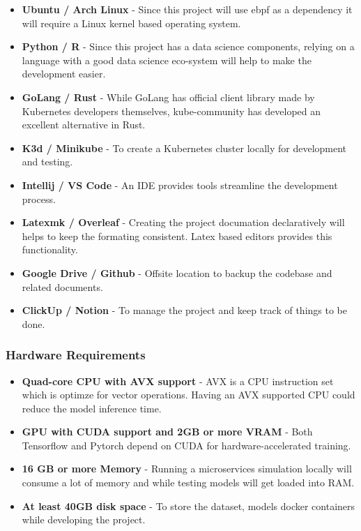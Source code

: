 \begin{itemize}[noitemsep,nolistsep] 
\item \textbf{Ubuntu / Arch Linux} - Since this project will use \ac{ebpf} as a dependency it will require a Linux kernel based operating system.
\item \textbf{Python / R} - Since this project has a data science components, relying on a language with a good data science eco-system will help to make the development easier.
\item \textbf{GoLang / Rust} - While GoLang has official client library made by Kubernetes developers themselves, kube-community has developed an excellent alternative in Rust.
\item \textbf{K3d / Minikube} - To create a Kubernetes cluster locally for development and testing.
\item \textbf{Intellij / VS Code} - An IDE provides tools streamline the development process.
\item \textbf{Latexmk / Overleaf} - Creating the project documation declaratively will helps to keep the formating consistent. Latex based editors provides this functionality.
\item \textbf{Google Drive / Github} - Offsite location to backup the codebase and related documents.
\item \textbf{ClickUp / Notion} - To manage the project and keep track of things to be done.
\end{itemize}

\subsubsection{Hardware Requirements}
\begin{itemize}[noitemsep,nolistsep] 
    \item \textbf{Quad-core CPU with AVX support} - AVX is a CPU instruction set which is optimze for vector operations. Having an AVX supported CPU could reduce the model inference time.
    \item \textbf{GPU with CUDA support and 2GB or more VRAM} - Both Tensorflow and Pytorch depend on CUDA for hardware-accelerated training.
    \item \textbf{16 GB or more Memory} - Running a microservices simulation locally will consume a lot of memory and while testing models will get loaded into RAM.
    \item \textbf{At least 40GB disk space} - To store the dataset, models docker containers while developing the project.
\end{itemize}

